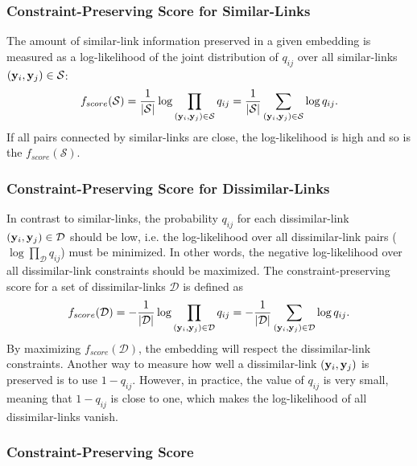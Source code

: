 \subsubsection*{Constraint-Preserving Score for Similar-Links}
The amount of similar-link information preserved in a given embedding is measured as a log-likelihood of the joint distribution of $q_{i j}$ over all similar-links $({\bf y}_i, {\bf y}_j) \in \mathcal{S}$:
\begin{equation}
f_{score}(\mathcal{S}) = \frac{1}{|\mathcal{S}|} \log \prod_{({\bf y}_i, {\bf y}_j) \in \mathcal{S}} q_{ij}
                = \frac{1}{|\mathcal{S}|} \sum_{({\bf y}_i, {\bf y}_j) \in \mathcal{S}} \log q_{ij}.
\end{equation}
If all pairs connected by similar-links are close, the log-likelihood is high and so is the $f_{score}(\mathcal{S})$.

\subsubsection*{Constraint-Preserving Score for Dissimilar-Links}
In contrast to similar-links, the probability $q_{ij}$ for each dissimilar-link $({\bf y}_i, {\bf y}_j) \in \mathcal{D}$ should be low, i.e. the log-likelihood over all dissimilar-link pairs ($\log \prod_{\mathcal{D}} q_{ij}$) must be minimized. In other words, the negative log-likelihood over all dissimilar-link constraints should be maximized. The constraint-preserving score for a set of dissimilar-links $\mathcal{D}$ is defined as
\begin{equation}
f_{score}(\mathcal{D}) = -\frac{1}{|\mathcal{D}|} \log \prod_{({\bf y}_i, {\bf y}_j) \in \mathcal{D}} q_{ij}
                = -\frac{1}{|\mathcal{D}|} \sum_{({\bf y}_i, {\bf y}_j) \in \mathcal{D}} \log q_{ij}.
\end{equation}
By maximizing $f_{score}(\mathcal{D})$, the embedding will respect the dissimilar-link constraints.
Another way to measure how well a dissimilar-link $({\bf y}_i, {\bf y}_j)$ is preserved is to use $1 - q_{ij}$. However, in practice, the value of $q_{ij}$ is very small, meaning that $1 - q_{ij}$ is close to one, which makes the log-likelihood of all dissimilar-links vanish.

\subsubsection*{Constraint-Preserving Score}


